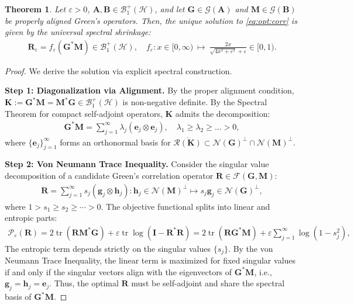 \documentclass[noinfoline]{imsart}\setcounter{tocdepth}{2}
\newcommand{\m}[1]{\mathbf{#1}}
\renewcommand{\c}[1]{\mathcal{#1}}
\DeclareMathOperator{\tr}{tr}
\theoremstyle{plain}
\newtheorem{theorem}{Theorem}[section]
\begin{document}
\begin{theorem}\label{thm:spec:contrac}
Let $\varepsilon > 0$, $\m{A}, \m{B} \in \c{B}_{1}^{+}(\c{H})$, and let $\m{G} \in \c{G}(\m{A})$ and $\m{M} \in \c{G}(\m{B})$ be properly aligned Green's operators.
Then, the unique solution to \eqref{eq:opt:corr} is given by the universal spectral shrinkage:
\begin{align*}
    \m{R}_{\varepsilon} = f_{\varepsilon}(\m{G}^{*} \m{M}) \in \c{B}_{1}^{+}(\c{H}), \quad f_{\varepsilon}: x \in [0, \infty) \ \mapsto \ \frac{2x}{\sqrt{4x^{2}+\varepsilon^{2}}+\varepsilon} \in [0, 1).
\end{align*}
\end{theorem}
\begin{proof}
We derive the solution via explicit spectral construction.

\noindent \textbf{Step 1: Diagonalization via Alignment.} 
By the proper alignment condition, $\m{K} := \m{G}^{*} \m{M} = \m{M}^{*} \m{G} \in \c{B}_{1}^{+}(\c{H})$ is non-negative definite. By the Spectral Theorem for compact self-adjoint operators, $\m{K}$ admits the decomposition:
\begin{align*}
    \m{G}^{*} \m{M} = \sum_{j=1}^{\infty} \lambda_{j} (\m{e}_{j} \otimes \m{e}_{j}), \quad \lambda_1 \ge \lambda_2 \ge \dots > 0,
\end{align*}
where $\{\m{e}_j\}_{j=1}^\infty$ forms an orthonormal basis for $\overline{\c{R}(\m{K})} \subset \c{N}(\m{G})^\perp \cap \c{N}(\m{M})^\perp$.

\noindent \textbf{Step 2: Von Neumann Trace Inequality.} 
Consider the singular value decomposition of a candidate Green's correlation operator $\m{R} \in \c{F}(\m{G}, \m{M})$:
\begin{align*}
    \m{R} = \sum_{j=1}^{\infty} s_{j} (\m{g}_{j} \otimes \m{h}_{j}) : \m{h}_{j} \in \c{N}(\m{M})^{\perp} \mapsto s_{j} \m{g}_{j} \in \c{N}(\m{G})^{\perp},
\end{align*}
where $1 > s_{1} \ge s_{2} \ge \cdots > 0$. The objective functional splits into linear and entropic parts:
\begin{align*}
    \c{P}_{\varepsilon}(\m{R}) = 2 \tr(\m{R} \m{M}^* \m{G}) + \varepsilon \tr \log(\m{I} - \m{R}^* \m{R}) = 2 \tr(\m{R} \m{G}^* \m{M}) + \varepsilon \sum_{j=1}^{\infty} \log(1 - s_j^2),
\end{align*}
The entropic term depends strictly on the singular values $\{s_j\}$. By the von Neumann Trace Inequality, the linear term is maximized for fixed singular values if and only if the singular vectors align with the eigenvectors of $\m{G}^*\m{M}$, i.e., $\m{g}_j = \m{h}_j = \m{e}_j$. Thus, the optimal $\m{R}$ must be self-adjoint and share the spectral basis of $\m{G}^* \m{M}$.


\end{proof}
\end{document}

